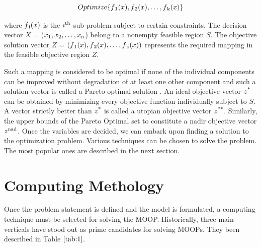 \documentclass[conference]{IEEEtran}
\begin{document}
\begin{equation}
Optimize \{f\textsubscript{1}(x), f\textsubscript{2}(x), \dots, f\textsubscript{k}(x)\}
\end{equation}

where $f\textsubscript{i}(x)$ is the $i\textsuperscript{th}$ sub-problem subject to certain constraints. The decision vector $X$ = ($x\textsubscript{1}, x\textsubscript{2}, \dots, x\textsubscript{n}$) belong to a nonempty feasible region $S$. The objective solution vector $Z$ =  $(f\textsubscript{1}(x), f\textsubscript{2}(x), \dots, f\textsubscript{k}(x))$ represents the required mapping in the feasible objective region $Z$. 

Such a mapping is considered to be optimal if none of the individual components can be improved without degradation of at least one other component and such a solution vector is called a Pareto optimal solution \cite{pare}. An ideal objective vector $z\textsuperscript{*}$ can be obtained by minimizing every objective function individually subject to $S$. A vector strictly better than $z\textsuperscript{*}$ is called a utopian objective vector $z\textsuperscript{**}$. Similarly, the upper bounds of the Pareto Optimal set to constitute a nadir objective vector $z\textsuperscript{nad}$. Once the variables are decided, we can embark upon finding a solution to the optimization problem. Various techniques can be chosen to solve the problem. The most popular ones are described in the next section. 

\section{Computing Methology}

Once the problem statement is defined and the model is formulated, a computing technique must be selected for solving the MOOP. Historically, three main verticals have stood out as prime candidates for solving MOOPs. They been described in Table $\ref{tab:1}$. 
\end{document}
